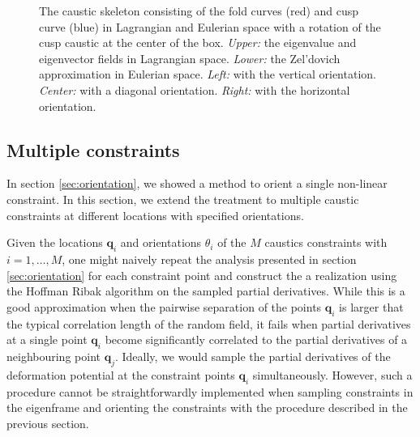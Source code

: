 \documentclass[a4paper, 11pt]{article}
\begin{document}
\begin{figure}
\begin{subfigure}[b]{0.32\textwidth}
\end{subfigure}
\caption{The caustic skeleton consisting of the fold curves (red) and cusp curve (blue) in Lagrangian and Eulerian space with a rotation of the cusp caustic at the center of the box. \textit{Upper:} the eigenvalue and eigenvector fields in Lagrangian space. \textit{Lower:} the Zel'dovich approximation in Eulerian space. \textit{Left:} with the vertical orientation. \textit{Center:} with a diagonal orientation. \textit{Right:} with the horizontal orientation.}\label{fig:rotation}
\end{figure}


\subsection{Multiple constraints}
In section \ref{sec:orientation}, we showed a method to orient a single non-linear constraint. In this section, we extend the treatment to multiple caustic constraints at different locations with specified orientations. 

Given the locations $\bm{q}_i$ and orientations $\theta_i$ of the $M$ caustics constraints with $i=1,\dots,M$, one might naively repeat the analysis presented in section \ref{sec:orientation} for each constraint point and construct the a realization using the Hoffman Ribak algorithm on the sampled partial derivatives. While this is a good approximation when the pairwise separation of the points $\bm{q}_i$ is larger that the typical correlation length of the random field, it fails when partial derivatives at a single point $\bm{q}_i$ become significantly correlated to the partial derivatives of a neighbouring point $\bm{q}_j$. Ideally, we would sample the partial derivatives of the deformation potential at the constraint points $\bm{q}_i$ simultaneously. However, such a procedure cannot be straightforwardly implemented when sampling constraints in the eigenframe and orienting the constraints with the procedure described in the previous section.
\end{document}
